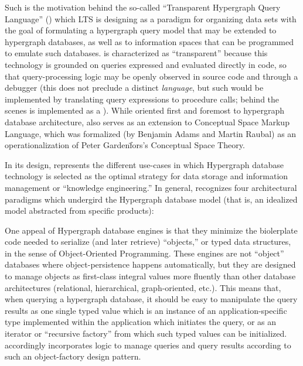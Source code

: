 \documentclass[11pt,letterpaper]{article}
\newcommand{\ATexttclr}[1]{\textcolor{tcolor}{\textbf{#1}}}
\newcommand{\THQL}{\resizebox{!}{7pt}{\ATexttclr{THQL}}}
\newcommand{\lTHQL}{\resizebox{!}{7.5pt}{\ATexttclr{T}}%
\resizebox{!}{7pt}{\ATexttclr{HQL}}}
\newcommand{\DSL}{\resizebox{!}{7pt}{\AcronymText{DSL}}}
\newcommand{\textscc}[1]{{\color{orr!35!black}{{%
						\fontfamily{Cabin-TLF}\fontseries{b}\selectfont{\textsc{\scriptsize{#1}}}}}}}
\newcommand{\AcronymText}[1]{{\textscc{#1}}}
\newcommand{\Cpp}{\resizebox{!}{7pt}{\AcronymText{C++}}}
\newcommand{\p}[1]{

\vspace{.7em}#1}
\newcommand{\q}[1]{{\fontfamily{qcr}\selectfont ``}#1{\fontfamily{qcr}\selectfont ''}}
\begin{document}
{\p{Such is the motivation behind the so-called 
\q{Transparent Hypergraph Query Language} (\THQL{}) which LTS 
is designing as a paradigm for organizing data sets 
with the goal of formulating a hypergraph query model that 
may be extended to hypergraph databases, as well 
as to information spaces that can be programmed to 
emulate such databases.  \lTHQL{} is characterized as \q{transparent} 
because this technology is grounded on queries expressed 
and evaluated directly in \Cpp{} code, so that query-processing 
logic may be openly observed in source code and through a 
debugger (this does not preclude a distinct \THQL{} 
\textit{language}, but such would be implemented 
by translating query expressions to \Cpp{} procedure calls; 
behind the scenes \THQL{} is implemented as a \Cpp{} \DSL{}).  
While oriented first and foremost to hypergraph database 
architecture, \THQL{} also serves as an extension 
to Conceptual Space Markup Language, which was 
formalized (by Benjamin Adams and Martin Raubal) 
as an operationalization of Peter Gardenf\"{}ors's 
Conceptual Space Theory.}


\p{In its design, \THQL{} represents the different use-cases 
in which Hypergraph database technology is selected as the 
optimal strategy for data storage and information management 
or \q{knowledge engineering.}  In general, \THQL{} recognizes 
four architectural paradigms which undergird the Hypergraph database 
model (that is, an idealized model abstracted from specific products):

\begin{description}[itemsep=1pt]
\item[Object Serialization]  One appeal of Hypergraph database 
engines is that they minimize the biolerplate code needed to 
serialize (and later retrieve) \q{objects,} or typed data structures, 
in the sense of Object-Oriented Programming.  These engines are not 
\q{object} databases where object-persistence happens automatically, 
but they are designed to manage objects as first-class integral 
values more fluently than other database architectures 
(relational, hierarchical, graph-oriented, etc.).  This means 
that, when querying a hypergraph database, it should be 
easy to manipulate the query results as one single typed 
value which is an instance of an application-specific 
type implemented within the application which initiates 
the query, or as an iterator or \q{recursive factory} from which such 
typed values can be initialized.  \lTHQL{} accordingly incorporates 
logic to manage queries and query results according to such an 
object-factory design pattern.


\end{description}}}
\end{document}
